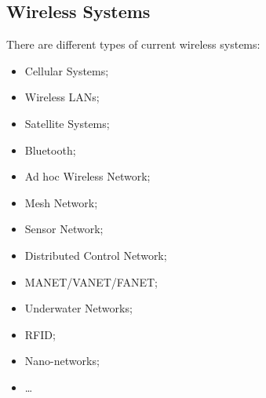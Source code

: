 \subsection{Wireless Systems}
There are different types of current wireless systems:
\begin{itemize}
    \item Cellular Systems;
    \item Wireless LANs;
    \item Satellite Systems;
    \item Bluetooth;
    \item Ad hoc Wireless Network;
    \item Mesh Network;
    \item Sensor Network;
    \item Distributed Control Network;
    \item MANET/VANET/FANET;
    \item Underwater Networks;
    \item RFID;
    \item Nano-networks;
    \item \dots
\end{itemize}